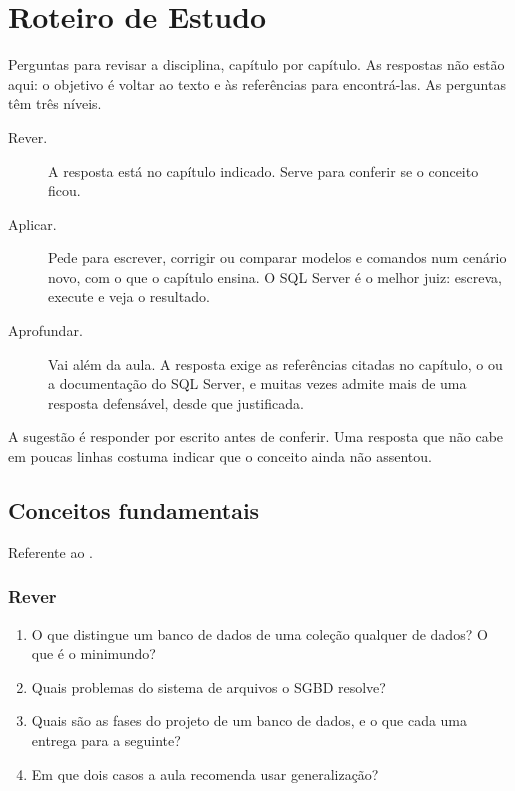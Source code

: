 \setchapterpreamble[u]{\margintoc}
\chapter{Roteiro de Estudo}

Perguntas para revisar a disciplina, capítulo por capítulo. As respostas
não estão aqui: o objetivo é voltar ao texto e às referências para
encontrá-las. As perguntas têm três níveis.

\begin{description}
	\item[Rever.] A resposta está no capítulo indicado. Serve para conferir
	se o conceito ficou.
	\item[Aplicar.] Pede para escrever, corrigir ou comparar modelos e
	comandos num cenário novo, com o que o capítulo ensina. O SQL Server é
	o melhor juiz: escreva, execute e veja o resultado.
	\item[Aprofundar.] Vai além da aula. A resposta exige as referências
	citadas no capítulo, o \textcite{Elmasri2011} ou a documentação do SQL
	Server, e muitas vezes admite mais de uma resposta defensável, desde
	que justificada.
\end{description}

A sugestão é responder por escrito antes de conferir. Uma resposta que
não cabe em poucas linhas costuma indicar que o conceito ainda não
assentou.

\section{Conceitos fundamentais}

Referente ao .

\subsection*{Rever}
\begin{enumerate}
	\item O que distingue um banco de dados de uma coleção qualquer de
	dados? O que é o minimundo?
	\item Quais problemas do sistema de arquivos o SGBD resolve?
	\item Quais são as fases do projeto de um banco de dados, e o que cada
	uma entrega para a seguinte?
	\item Em que dois casos a aula recomenda usar generalização?
\end{enumerate}

